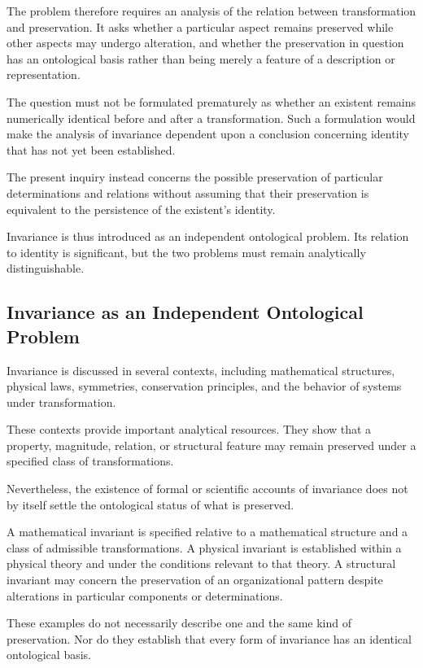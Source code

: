 The problem therefore requires an analysis of the relation
between transformation and preservation. It asks whether a
particular aspect remains preserved while other aspects may
undergo alteration, and whether the preservation in question
has an ontological basis rather than being merely a feature
of a description or representation.

The question must not be formulated prematurely as whether
an existent remains numerically identical before and after
a transformation. Such a formulation would make the analysis
of invariance dependent upon a conclusion concerning identity
that has not yet been established.

The present inquiry instead concerns the possible preservation
of particular determinations and relations without assuming
that their preservation is equivalent to the persistence
of the existent's identity.

Invariance is thus introduced as an independent ontological
problem. Its relation to identity is significant, but the
two problems must remain analytically distinguishable.

\subsection{Invariance as an Independent Ontological Problem}

Invariance is discussed in several contexts, including
mathematical structures, physical laws, symmetries,
conservation principles, and the behavior of systems
under transformation.

These contexts provide important analytical resources.
They show that a property, magnitude, relation, or structural
feature may remain preserved under a specified class of
transformations.

Nevertheless, the existence of formal or scientific accounts
of invariance does not by itself settle the ontological status
of what is preserved.

A mathematical invariant is specified relative to a
mathematical structure and a class of admissible transformations.
A physical invariant is established within a physical theory
and under the conditions relevant to that theory. A structural
invariant may concern the preservation of an organizational
pattern despite alterations in particular components or
determinations.

These examples do not necessarily describe one and the same
kind of preservation. Nor do they establish that every form
of invariance has an identical ontological basis.

